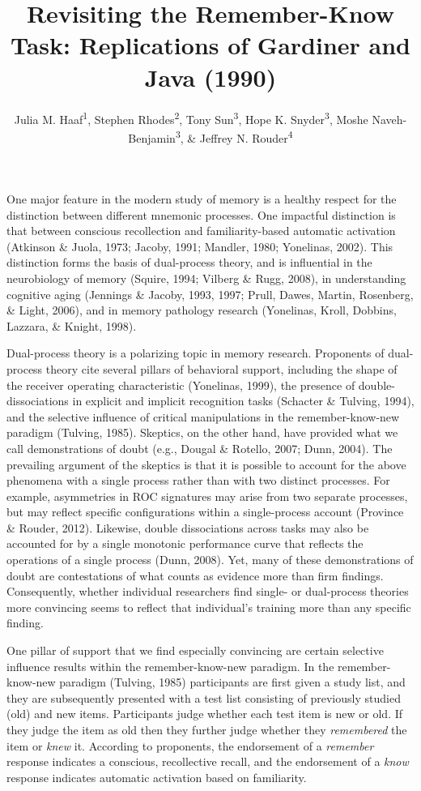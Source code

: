 \documentclass[english,,man]{apa6}
\title{Revisiting the Remember-Know Task: Replications of Gardiner and Java (1990)}
\author{Julia M. Haaf\textsuperscript{1}, Stephen Rhodes\textsuperscript{2}, Tony Sun\textsuperscript{3}, Hope K. Snyder\textsuperscript{3}, Moshe Naveh-Benjamin\textsuperscript{3}, \& Jeffrey N. Rouder\textsuperscript{4}}
\date{}
\affiliation{
\vspace{0.5cm}
\textsuperscript{1} University of Amsterdam\\\textsuperscript{2} Rotman Research Institute, Baycrest\\\textsuperscript{3} University of Missouri\\\textsuperscript{4} University of California, Irvine}
\begin{document}
\maketitle

One major feature in the modern study of memory is a healthy respect for the distinction between different mnemonic processes. One impactful distinction is that between conscious recollection and familiarity-based automatic activation (Atkinson \& Juola, 1973; Jacoby, 1991; Mandler, 1980; Yonelinas, 2002). This distinction forms the basis of dual-process theory, and is influential in the neurobiology of memory (Squire, 1994; Vilberg \& Rugg, 2008), in understanding cognitive aging (Jennings \& Jacoby, 1993, 1997; Prull, Dawes, Martin, Rosenberg, \& Light, 2006), and in memory pathology research (Yonelinas, Kroll, Dobbins, Lazzara, \& Knight, 1998).

Dual-process theory is a polarizing topic in memory research. Proponents of dual-process theory cite several pillars of behavioral support, including the shape of the receiver operating characteristic (Yonelinas, 1999), the presence of double-dissociations in explicit and implicit recognition tasks (Schacter \& Tulving, 1994), and the selective influence of critical manipulations in the remember-know-new paradigm (Tulving, 1985). Skeptics, on the other hand, have provided what we call demonstrations of doubt (e.g., Dougal \& Rotello, 2007; Dunn, 2004). The prevailing argument of the skeptics is that it is possible to account for the above phenomena with a single process rather than with two distinct processes. For example, asymmetries in ROC signatures may arise from two separate processes, but may reflect specific configurations within a single-process account (Province \& Rouder, 2012). Likewise, double dissociations across tasks may also be accounted for by a single monotonic performance curve that reflects the operations of a single process (Dunn, 2008). Yet, many of these demonstrations of doubt are contestations of what counts as evidence more than firm findings. Consequently, whether individual researchers find single- or dual-process theories more convincing seems to reflect that individual's training more than any specific finding.

One pillar of support that we find especially convincing are certain selective influence results within the remember-know-new paradigm. In the remember-know-new paradigm (Tulving, 1985) participants are first given a study list, and they are subsequently presented with a test list consisting of previously studied (old) and new items. Participants judge whether each test item is new or old. If they judge the item as old then they further judge whether they \emph{remembered} the item or \emph{knew} it. According to proponents, the endorsement of a \emph{remember} response indicates a conscious, recollective recall, and the endorsement of a \emph{know} response indicates automatic activation based on familiarity.
\end{document}
